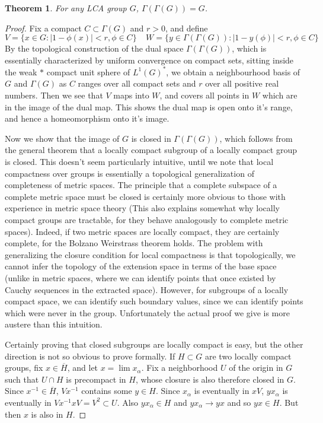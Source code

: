 \documentclass{article}
\theoremstyle{plain}
\newtheorem{theorem}{Theorem}
\theoremstyle{definition}
\begin{document}
\begin{theorem}
    For any LCA group $G$, $\Gamma(\Gamma(G)) = G$.
\end{theorem}
\begin{proof}
Fix a compact $C \subset \Gamma(G)$ and $r > 0$, and define
%
\[ V = \{ x \in G: |1 - \phi(x)| < r, \phi \in C \}\ \ \ \ \ W = \{ y \in \Gamma(\Gamma(G)) : |1 - y(\phi)| < r, \phi \in C \} \]
%
By the topological construction of the dual space $\Gamma(\Gamma(G))$, which is essentially characterized by uniform convergence on compact sets, sitting inside the weak $*$ compact unit sphere of $L^1(G)^*$, we obtain a neighbourhood basis of $G$ and $\Gamma(G)$ as $C$ ranges over all compact sets and $r$ over all positive real numbers. Then we see that $V$ maps into $W$, and covers all points in $W$ which are in the image of the dual map. This shows the dual map is open onto it's range, and hence a homeomorphism onto it's image.

Now we show that the image of $G$ is closed in $\Gamma(\Gamma(G))$, which follows from the general theorem that a locally compact subgroup of a locally compact group is closed. This doesn't seem particularly intuitive, until we note that local compactness over groups is essentially a topological generalization of completeness of metric spaces. The principle that a complete subspace of a complete metric space must be closed is certainly more obvious to those with experience in metric space theory (This also explains somewhat why locally compact groups are tractable, for they behave analogously to complete metric spaces). Indeed, if two metric spaces are locally compact, they are certainly complete, for the Bolzano Weirstrass theorem holds. The problem with generalizing the closure condition for local compactness is that topologically, we cannot infer the topology of the extension space in terms of the base space (unlike in metric spaces, where we can identify points that once existed by Cauchy sequences in the extracted space). However, for subgroups of a locally compact space, we can identify such boundary values, since we can identify points which were never in the group. Unfortunately the actual proof we give is more austere than this intuition.

Certainly proving that closed subgroups are locally compact is easy, but the other direction is not so obvious to prove formally. If $H \subset G$ are two locally compact groups, fix $x \in \overline{H}$, and let $x = \lim x_\alpha$. Fix a neighborhood $U$ of the origin in $G$ such that $U \cap H$ is precompact in $H$, whose closure is also therefore closed in $G$. Since $x^{-1} \in \overline{H}$, $Vx^{-1}$ contains some $y \in H$. Since $x_\alpha$ is eventually in $xV$, $y x_\alpha$ is eventually in $Vx^{-1}xV = V^2 \subset U$. Also $yx_\alpha \in H$ and $yx_\alpha \to yx$ and so $yx \in H$. But then $x$ is also in $H$.


\end{proof}
\end{document}
